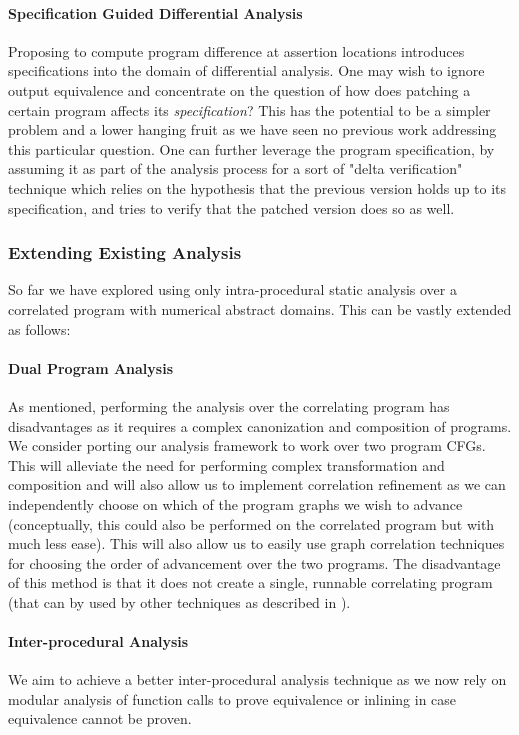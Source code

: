 \paragraph{Specification Guided Differential Analysis}
Proposing to compute program difference at assertion locations introduces specifications into the domain of differential analysis. One may wish to ignore output equivalence and concentrate on the question of how does patching a certain program affects its \emph{specification}? This has the potential to be a simpler problem and a lower hanging fruit as we have seen no previous work addressing this particular question. One can further leverage the program specification, by assuming it as part of the analysis process for a sort of "delta verification" technique which relies on the hypothesis that the previous version holds up to its specification, and tries to verify that the patched version does so as well.


\subsubsection{Extending Existing Analysis}

So far we have explored using only intra-procedural static analysis over a correlated program with numerical abstract domains. This can be vastly extended as follows:

\paragraph{Dual Program Analysis}
As mentioned, performing the analysis over the correlating program has disadvantages as it requires a complex canonization and composition of programs. We consider porting our analysis framework to work over two program CFGs. This will alleviate the need for performing complex transformation and composition and will also allow us to implement correlation refinement as we can independently choose on which of the program graphs we wish to advance (conceptually, this could also be performed on the correlated program but with much less ease). This will also allow us to easily use graph correlation techniques for choosing the order of advancement over the two programs. The disadvantage of this method is that it does not create a single, runnable correlating program (that can by used by other techniques as described in ).

\paragraph{Inter-procedural Analysis} 
We aim to achieve a better inter-procedural analysis technique as we now rely on modular analysis of function calls to prove equivalence or inlining in case equivalence cannot be proven.

